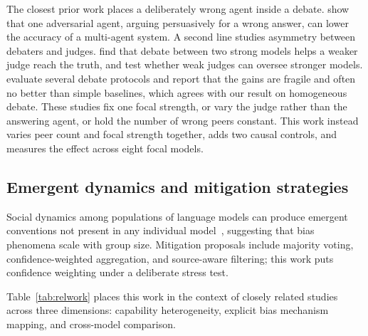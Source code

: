 \documentclass[11pt]{article}
\begin{document}
The closest prior work places a deliberately wrong agent inside a debate.
\citet{amayuelas2024multiagent} show that one adversarial agent, arguing
persuasively for a wrong answer, can lower the accuracy of a multi-agent
system.
A second line studies asymmetry between debaters and judges.
\citet{khan2024debating} find that debate between two strong models helps a
weaker judge reach the truth, and \citet{kenton2024scalable} test whether
weak judges can oversee stronger models.
\citet{smit2024going} evaluate several debate protocols and report that the
gains are fragile and often no better than simple baselines, which agrees
with our result on homogeneous debate.
These studies fix one focal strength, or vary the judge rather than the
answering agent, or hold the number of wrong peers constant.
This work instead varies peer count and focal strength together, adds two
causal controls, and measures the effect across eight focal models.

\subsection{Emergent dynamics and mitigation strategies}
\label{sub:emergent}

Social dynamics among populations of language models can produce emergent
conventions not present in any individual model~\citep{ashery2025emergent},
suggesting that bias phenomena scale with group size.
Mitigation proposals include majority voting, confidence-weighted
aggregation, and source-aware filtering; this work puts confidence
weighting under a deliberate stress test.

Table~\ref{tab:relwork} places this work in the context of closely related
studies across three dimensions: capability heterogeneity, explicit bias
mechanism mapping, and cross-model comparison.
\end{document}
